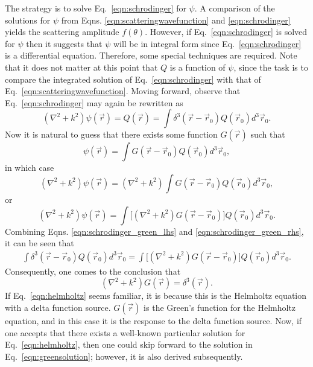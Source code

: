The strategy is to solve Eq.~\eqref{eqn:schrodinger} for $\psi$. A comparison of the solutions for $\psi$ from Eqns. \ref{eqn:scatteringwavefunction} and \ref{eqn:schrodinger} yields the scattering amplitude $f(\theta)$. However, if Eq.~\eqref{eqn:schrodinger} is solved for $\psi$ then it suggests that $\psi$ will be in integral form since  Eq.~\eqref{eqn:schrodinger} is a differential equation. Therefore, some special techniques are required. Note that it does not matter at this point that $Q$ is a function of $\psi$, since the task is to compare the integrated solution of Eq.~\eqref{eqn:schrodinger} with that of Eq.~\eqref{eqn:scatteringwavefunction}. Moving forward, observe  that Eq.~\eqref{eqn:schrodinger} may again be rewritten as
%
\begin{equation} \label{eqn:schrodinger_green_lhs}
(\nabla^2+k^2)\psi(\vec{r})=Q (\vec{r}) =\int \delta^3(\vec{r}-\vec{r}_0)Q(\vec{r}_0)d^3\vec{r}_0.
\end{equation}
Now it is natural to guess that there exists some function $G(\vec{r})$ such that
%
\begin{equation}
\label{eqn:psigreen}
\psi(\vec{r})=\int G(\vec{r}-\vec{r}_0)Q(\vec{r}_0)d^3\vec{r}_0,
\end{equation}
in which case
%
\begin{equation} \nonumber
(\nabla^2+k^2)\psi(\vec{r})=(\nabla^2+k^2)\int G(\vec{r}-\vec{r}_0)Q(\vec{r}_0) d^3\vec{r}_0,
\end{equation}
or
\begin{equation} \label{eqn:schrodinger_green_rhs}
(\nabla^2+k^2)\psi(\vec{r})=\int \big[(\nabla^2+k^2)G(\vec{r}-\vec{r}_0)\big]Q(\vec{r}_0) d^3\vec{r}_0.
\end{equation}
%
Combining Eqns. \ref{eqn:schrodinger_green_lhs} and \ref{eqn:schrodinger_green_rhs}, it can be seen that
\begin{align*}
\int \delta^3(\vec{r}-\vec{r}_0)Q(\vec{r}_0)d^3\vec{r}_0=\int \big[(\nabla^2+k^2)G(\vec{r}-\vec{r}_0)\big]Q(\vec{r}_0) d^3\vec{r}_0.
\end{align*}
Consequently, one comes to the conclusion that
%
\begin{equation}
\label{eqn:helmholtz}
(\nabla^2+k^2)G(\vec{r})=\delta^3(\vec{r}).
\end{equation}
If Eq.~\eqref{eqn:helmholtz} seems familiar, it is because this is the Helmholtz equation with a delta function source. $G(\vec{r})$ is the Green's function for the Helmholtz equation, and in this case it is the response to the delta function source. Now, if one accepts that there exists a well-known particular solution for Eq.~\eqref{eqn:helmholtz}, then one could skip forward to the solution in Eq.~\eqref{eqn:greensolution}; however, it is also derived subsequently.


